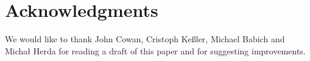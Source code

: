 \section{Acknowledgments}

We would like to thank John Cowan, Cristoph Keßler, Michael Babich and
Michał Herda for reading a draft of this paper and for suggesting
improvements.
